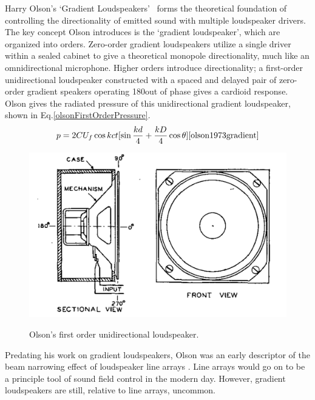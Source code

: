\documentclass{report}
\begin{document}
        Harry Olson's `Gradient Loudspeakers'~\cite{olson1973gradient} forms the theoretical foundation of controlling the directionality of emitted sound with multiple loudspeaker drivers.
        The key concept Olson introduces is the `gradient loudspeaker', which are organized into orders.
        Zero-order gradient loudspeakers utilize a single driver within a sealed cabinet to give a theoretical monopole directionality, much like an omnidirectional microphone.
        Higher orders introduce directionality; a first-order unidirectional loudspeaker constructed with a spaced and delayed pair of zero-order gradient speakers operating 180\degree\@ out of phase gives a cardioid response.
        Olson gives the radiated pressure of this unidirectional gradient loudspeaker, shown in Eq.\ref{olsonFirstOrderPressure}.
        \begin{equation}
            p = 2CU_f\cos{kct}[\sin{\frac{kd}{4}+\frac{kD}{4}\cos{\theta}}]
            \label{olsonFirstOrderPressure}
            \cite{olson1973gradient}
        \end{equation}
        \begin{figure}[H]
            \centering
            \includegraphics[scale=0.2]{figs/olsonFirstOrder.png}%
            \caption{Olson's first order unidirectional loudspeaker.}\cite{olson1973gradient}
            \label{olsonFirstOrderDiagram}
        \end{figure}
        Predating his work on gradient loudspeakers, Olson was an early descriptor of the beam narrowing effect of loudspeaker line arrays \cite{olson1957acoustical}.
        Line arrays would go on to be a principle tool of sound field control in the modern day.
        However, gradient loudspeakers are still, relative to line arrays, uncommon.
\end{document}
